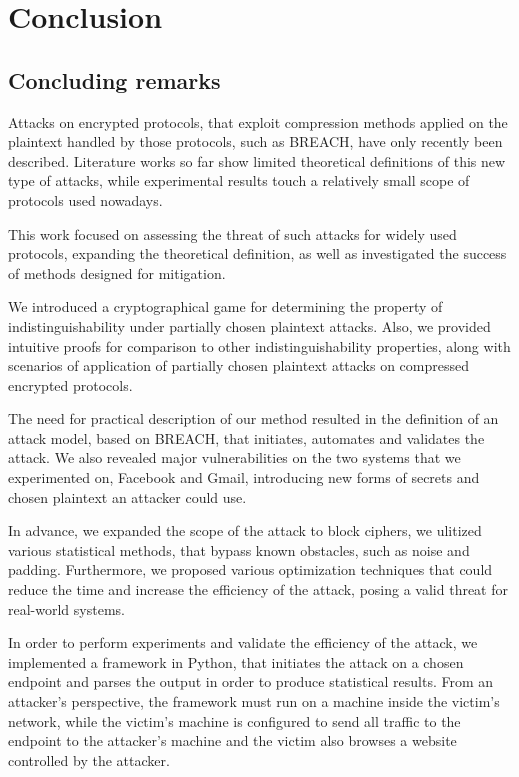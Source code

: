 \chapter{Conclusion}\label{conclusion}

\section{Concluding remarks}

Attacks on encrypted protocols, that exploit compression methods applied on the
plaintext handled by those protocols, such as BREACH, have only recently been
described.  Literature works so far show limited theoretical definitions of this
new type of attacks, while experimental results touch a relatively small scope
of protocols used nowadays.

This work focused on assessing the threat of such attacks for widely used
protocols, expanding the theoretical definition, as well as investigated the
success of methods designed for mitigation.

We introduced a cryptographical game for determining the property of
indistinguishability under partially chosen plaintext attacks. Also, we provided
intuitive proofs for comparison to other indistinguishability properties, along
with scenarios of application of partially chosen plaintext attacks on
compressed encrypted protocols.

The need for practical description of our method resulted in the definition of
an attack model, based on BREACH, that initiates, automates and validates the
attack. We also revealed major vulnerabilities on the two systems that we
experimented on, Facebook and Gmail, introducing new forms of secrets and chosen
plaintext an attacker could use.

In advance, we expanded the scope of the attack to block ciphers, we ulitized
various statistical methods, that bypass known obstacles, such as noise and
padding.  Furthermore, we proposed various optimization techniques that could
reduce the time and increase the efficiency of the attack, posing a valid threat
for real-world systems.

In order to perform experiments and validate the efficiency of the attack, we
implemented a framework in Python, that initiates the attack on a chosen
endpoint and parses the output in order to produce statistical results. From an
attacker's perspective, the framework must run on a machine inside the victim's
network, while the victim's machine is configured to send all traffic to the
endpoint to the attacker's machine and the victim also  browses a website
controlled by the attacker.

